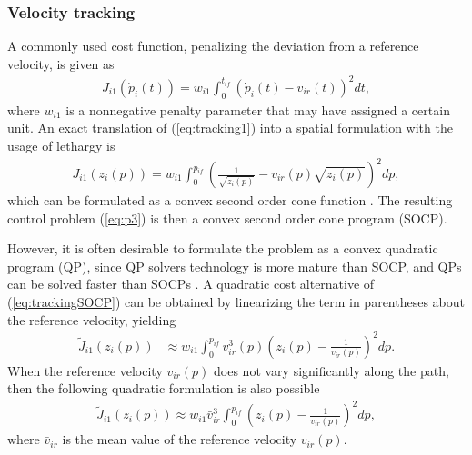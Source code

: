 \documentclass[letterpaper,10pt,conference]{ieeeconf}
\begin{document}
\subsubsection{Velocity tracking} A commonly used cost function,  penalizing the deviation from a reference velocity, is given as
\begin{align} \label{eq:tracking1}
J_{i1}(\dot p_i(t))=w_{i1} \int_0^{t_{if}} (\dot p_i(t)-v_{ir}(t))^2 dt,
\end{align}
where $w_{i1}$ is a nonnegative penalty parameter that may have assigned a certain unit. An exact translation of (\ref{eq:tracking1}) into a spatial formulation with the usage of lethargy is %
\begin{align} \label{eq:trackingSOCP}
J_{i1}(z_i(p))=w_{i1} \int_0^{p_{if}} \left(\frac{1}{\sqrt{z_i(p)}}-v_{ir}(p)\sqrt{z_i(p)} \right)^2 dp,
\end{align}%
which can be formulated as a convex second order cone function \cite{boyd04}. The resulting control problem (\ref{eq:p3}) is then a convex second order cone program (SOCP).

However, it is often desirable to formulate the problem as a convex quadratic program (QP), since QP solvers technology is more mature than SOCP, and QPs can be solved faster than SOCPs \cite{boyd04}. A quadratic cost alternative of (\ref{eq:trackingSOCP}) can be obtained by linearizing the term in parentheses about the reference velocity, yielding
\begin{align} \label{eq:trackingQP}
\tilde J_{i1}(z_i(p)) &\approx w_{i1} \int_0^{p_{if}} v_{ir}^3(p) \left(z_i(p)-\frac{1}{v_{ir}(p)} \right)^2 dp.
\end{align}
When the reference velocity $v_{ir}(p)$ does not vary significantly along the path, then the following quadratic formulation is also possible
\begin{align} \label{eq:trackingQP2}
\tilde J_{i1}(z_i(p)) \approx w_{i1} \bar v_{ir}^3 \int_0^{p_{if}} \left(z_i(p)-\frac{1}{v_{ir}(p)} \right)^2 dp,
\end{align}
where $\bar v_{ir}$ is the mean value of the reference velocity $v_{ir}(p)$.
\end{document}

